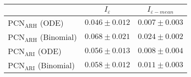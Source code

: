 \begin{tabular}{|l|c|c|}
    \hline
        & $I_\varepsilon$ & $I_{\varepsilon-mean}$ \\
    \hline
        $\text{PCN}_\text{ARH}$  (ODE) & $0.046 \pm 0.012$ & $0.007 \pm 0.003$ \\
        \hline
        $\text{PCN}_\text{ARH}$  (Binomial) &  $0.068 \pm 0.021$ & $0.024 \pm 0.002$ \\
        \hline
        $\text{PCN}_\text{ARI}$  (ODE) & $0.056 \pm 0.013$ & $0.008 \pm 0.004$ \\
        \hline
        $\text{PCN}_\text{ARI}$  (Binomial) &  $0.058 \pm 0.012$ & $0.011 \pm 0.003$ \\
        \hline
\end{tabular}
